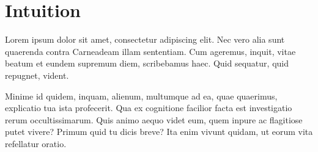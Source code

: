 \documentclass[preprint]{sigplanconf}
\begin{document}

%
%
%
%

\section{Intuition}

Lorem ipsum dolor sit amet, consectetur adipiscing elit. Nec vero alia sunt
quaerenda contra Carneadeam illam sententiam. Cum ageremus, inquit, vitae beatum
et eundem supremum diem, scribebamus haec. Quid sequatur, quid repugnet, vident.

Minime id quidem, inquam, alienum, multumque ad ea, quae quaerimus, explicatio
tua ista profecerit. Qua ex cognitione facilior facta est investigatio rerum
occultissimarum. Quis animo aequo videt eum, quem inpure ac flagitiose putet
vivere? Primum quid tu dicis breve? Ita enim vivunt quidam, ut eorum vita
refellatur oratio.
\end{document}
